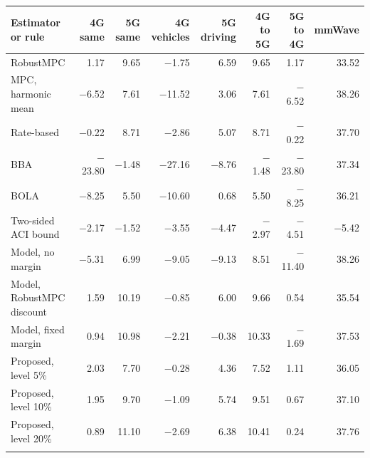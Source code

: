 \begin{tabular}{@{}lrrrrrrr@{}}
\toprule
Estimator or rule & 4G same & 5G same & 4G vehicles & 5G driving & 4G to 5G & 5G to 4G & mmWave \\
\midrule
RobustMPC & 1.17 & 9.65 & $-$1.75 & 6.59 & 9.65 & 1.17 & 33.52 \\
MPC, harmonic mean & $-$6.52 & 7.61 & $-$11.52 & 3.06 & 7.61 & $-$6.52 & 38.26 \\
Rate-based & $-$0.22 & 8.71 & $-$2.86 & 5.07 & 8.71 & $-$0.22 & 37.70 \\
BBA & $-$23.80 & $-$1.48 & $-$27.16 & $-$8.76 & $-$1.48 & $-$23.80 & 37.34 \\
BOLA & $-$8.25 & 5.50 & $-$10.60 & 0.68 & 5.50 & $-$8.25 & 36.21 \\
Two-sided ACI bound & $-$2.17 & $-$1.52 & $-$3.55 & $-$4.47 & $-$2.97 & $-$4.51 & $-$5.42 \\
Model, no margin & $-$5.31 & 6.99 & $-$9.05 & $-$9.13 & 8.51 & $-$11.40 & 38.26 \\
Model, RobustMPC discount & 1.59 & 10.19 & $-$0.85 & 6.00 & 9.66 & 0.54 & 35.54 \\
Model, fixed margin & 0.94 & 10.98 & $-$2.21 & $-$0.38 & 10.33 & $-$1.69 & 37.53 \\
Proposed, level 5\% & 2.03 & 7.70 & $-$0.28 & 4.36 & 7.52 & 1.11 & 36.05 \\
Proposed, level 10\% & 1.95 & 9.70 & $-$1.09 & 5.74 & 9.51 & 0.67 & 37.10 \\
Proposed, level 20\% & 0.89 & 11.10 & $-$2.69 & 6.38 & 10.41 & 0.24 & 37.76 \\
\botrule
\end{tabular}

